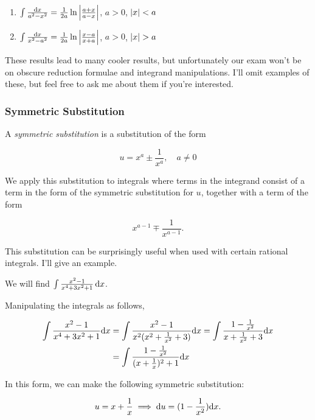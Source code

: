 \documentclass{article}
\begin{document}
{\begin{enumerate}
      \item \(\int \frac{\mathrm{d} x}{a^2 - x^2} = \frac{1}{2a}\ln\left\lvert \frac{a+x}{a-x}\right\rvert\), \hspace*{1cm} \(a > 0\), \(\left\lvert x\right\rvert < a\)
      
      \item \(\int \frac{\mathrm{d} x}{x^2 - a^2} = \frac{1}{2a} \ln\left\lvert \frac{x-a}{x+a}\right\rvert\), \hspace*{1cm} \(a > 0\), \(\left\lvert x\right\rvert > a\)
    \end{enumerate}

    These results lead to many cooler results, but unfortunately our exam won't be on obscure reduction formulae and integrand manipulations. I'll omit examples of these, but feel free to ask me about them if you're interested.

    \subsubsection*{Symmetric Substitution}
    A \emph{symmetric substitution} is a substitution of the form 

    \[
      u = x^a \pm \frac{1}{x^a}, \quad a \neq 0
    \]

    We apply this substitution to integrals where terms in the integrand consist of a term in the form of the symmetric substitution for \(u\), together with a term of the form 

    \[
      x^{a-1}  \mp \frac{1}{x^{a-1}}.
    \]

    This substitution can be surprisingly useful when used with certain rational integrals. I'll give an example.

    \begin{eg}
      We will find \(\int \frac{x^2-1}{x^4 + 3x^2 + 1} \, \mathrm{d} x\). 
      \vspace*{0.5cm}

      Manipulating the integrals as follows,

      \begin{align*}
        \int \frac{x^2-1}{x^4+3x^2+1} \mathrm{d} x &= \int \frac{x^2-1}{x^2(x^2 + \frac{1}{x^2}+3)} \mathrm{d} x = \int \frac{1 - \frac{1}{x^2}}{x+\frac{1}{x^2} + 3} \mathrm{d} x \\ 
        &= \int \frac{1 - \frac{1}{x^2}}{(x+\frac{1}{x})^2 + 1} \mathrm{d} x
      \end{align*}

      In this form, we can make the following symmetric substitution:

      \[
        u = x + \frac{1}{x} \implies \mathrm{d} u = (1 - \frac{1}{x^2}) \mathrm{d} x.
      \]


\end{eg}}
\end{document}
